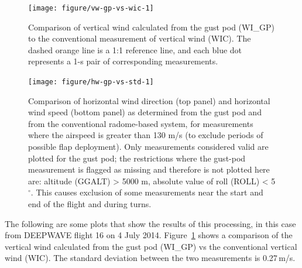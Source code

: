 \documentclass[12pt,twoside,english]{article}\usepackage[]{graphicx}\usepackage[]{color}
\newenvironment{knitrout}{}{} %
\begin{document}
\begin{knitrout}
\color{fgcolor}\begin{figure}
\texttt{[image: figure/vw-gp-vs-wic-1]} \caption[Comparison of vertical wind calculated from the gust pod (WI\_GP) to the conventional measurement of vertical wind (WIC)]{Comparison of vertical wind calculated from the gust pod (WI\_GP) to the conventional measurement of vertical wind (WIC). The dashed orange line is a 1:1 reference line, and each blue dot represents a 1-s pair of corresponding measurements.}\label{fig:vw-gp-vs-wic}
\end{figure}


\end{knitrout}
\begin{knitrout}
\color{fgcolor}\begin{figure}
\texttt{[image: figure/hw-gp-vs-std-1]} \caption[Horizontal wind direction and speed from the gust pod and from the conventional radome-based system.]{Comparison of horizontal wind direction (top panel) and horizontal wind speed (bottom panel) as determined from the gust pod and from the conventional radome-based system, for measurements where the airspeed is greater than 130 m/s (to exclude periods of possible flap deployment). Only measurements considered valid are plotted for the gust pod; the restrictions where the gust-pod measurement is flagged as missing and therefore is not plotted here are: altitude (GGALT) > 5000 m, absolute value of roll (ROLL) < 5$^{\circ}$. This causes exclusion of some measurements near the start and end of the flight and during turns.}\label{fig:hw-gp-vs-std}
\end{figure}


\end{knitrout}

The following are some plots that show the results of this processing, in this case from DEEPWAVE flight 16 on 4 July 2014. Figure~\ref{fig:vw-gp-vs-wic} shows  a comparison of the vertical wind calculated from the gust pod (WI\_GP) vs the conventional vertical wind (WIC). The standard deviation between the two measurements is 0.27\,m/s. %
\end{document}

